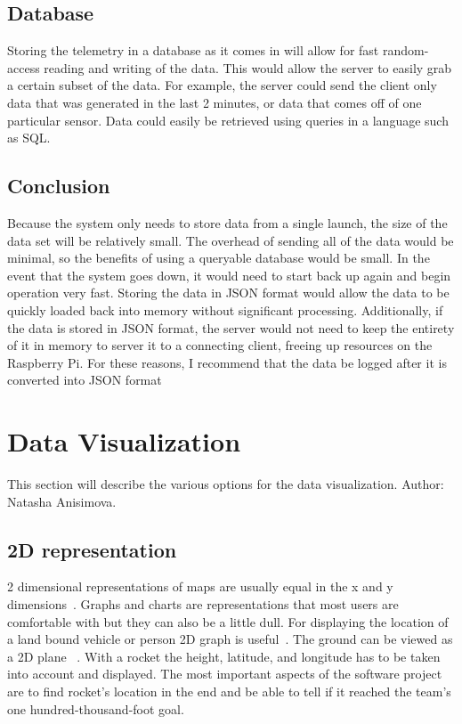 \documentclass[10pt,draftclsnofoot,onecolumn]{IEEEtran}
\begin{document}
	\subsection{Database}
	Storing the telemetry in a database as it comes in will allow for fast random-access reading and writing of the data.
	This would allow the server to easily grab a certain subset of the data.
	For example, the server could send the client only data that was generated in the last 2 minutes, or data that comes off of one particular sensor.
	Data could easily be retrieved using queries in a language such as SQL.
	
	\subsection{Conclusion}
	Because the system only needs to store data from a single launch, the size of the data set will be relatively small.
	The overhead of sending all of the data would be minimal, so the benefits of using a queryable database would be small.
	In the event that the system goes down, it would need to start back up again and begin operation very fast.
	Storing the data in \ac{JSON} format would allow the data to be quickly loaded back into memory without significant processing.
	Additionally, if the data is stored in \ac{JSON} format, the server would not need to keep the entirety of it in memory to server it to a connecting client, freeing up resources on the Raspberry Pi.
	For these reasons, I recommend that the data be logged after it is converted into \ac{JSON} format

	\section{Data Visualization}
	This section will describe the various options for the data visualization. Author: Natasha Anisimova.
	
	\subsection{2D representation}
	2 dimensional representations of maps are usually equal in the x and y dimensions~\cite{2d-is-better-than-3d}. 
	Graphs and charts are representations that most users are comfortable with but they can also be a little dull.
	For displaying the location of a land bound vehicle or person 2D graph is useful~\cite{2ds-company-3ds-a-crowd}. 
	The ground can be viewed as a 2D plane ~\cite{2d-and-3d-presentation-of-spatial-data}.
	With a rocket the height, latitude, and longitude has to be taken into 
	account and displayed. 
	The most important aspects of the software project are to find rocket’s location in the end and be able to tell 
	if it reached the team’s one hundred-thousand-foot goal. 
	
\end{document}
